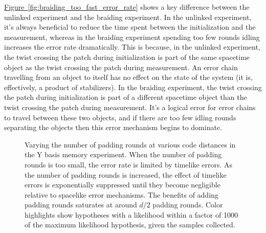 \documentclass[onecolumn,unpublished,a4paper]{quantumarticle}
\theoremstyle{definition}
\theoremstyle{definition}
\theoremstyle{definition}
\newcommand{\fig}[1]{\hyperref[fig:#1]{Figure~\ref*{fig:#1}}}
\begin{document}
\fig{braiding_too_fast_error_rate} shows a key difference between the unlinked experiment and the braiding experiment.
In the unlinked experiment, it's always beneficial to reduce the time spent between the initialization and the measurement, whereas in the braiding experiment spending too few rounds idling increases the error rate dramatically.
This is because, in the unlinked experiment, the twist crossing the patch during initialization is part of the same spacetime object as the twist crossing the patch during measurement.
An error chain travelling from an object to itself has no effect on the state of the system (it is, effectively, a product of stabilizers).
In the braiding experiment, the twist crossing the patch during initialization is part of a different spacetime object than the twist crossing the patch during measurement.
It's a logical error for error chains to travel between these two objects, and if there are too few idling rounds separating the objects then this error mechanism begins to dominate.

\begin{figure}[H]
    \centering
    \caption{
        Varying the number of padding rounds at various code distances in the Y basis memory experiment.
        When the number of padding rounds is too small, the error rate is limited by timelike errors.
        As the number of padding rounds is increased, the effect of timelike errors is exponentially suppressed until they become negligible relative to spacelike error mechanisms.
        The benefits of adding padding rounds saturates at around $d/2$ padding rounds.
        Color highlights show hypotheses with a likelihood within a factor of 1000 of the maximum likelihood hypothesis, given the samples collected.
    }
    \label{fig:pad_saturation}
\end{figure}
\end{document}
